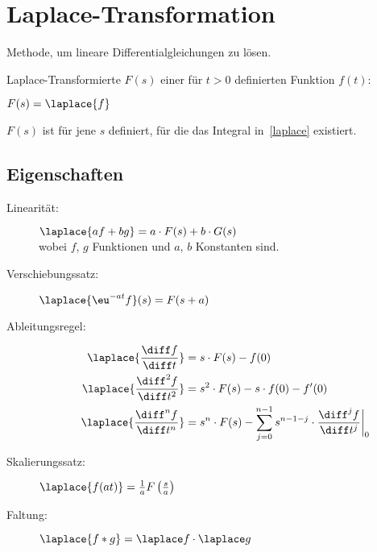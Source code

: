 
\section{Laplace-Transformation} %
	Methode, um lineare Differentialgleichungen zu lösen.

	\begin{definition}
		Laplace-Transformierte $F(s)$ einer für $t > 0$ definierten Funktion $f(t)$:
	\end{definition}

	\begin{notation}
		$
			F(s) = \laplace{f}
		$
	\end{notation}

	\begin{bemerkung}
		$F(s)$ ist für jene $s$ definiert, für die das Integral in~\eqref{laplace} existiert.
	\end{bemerkung}
	
	\subsection{Eigenschaften} %
		\begin{description}
			\item[Linearität:]
			$
				\laplace{a f + b g} = a \cdot F(s) + b \cdot G(s)
			$ \\[1ex]
			wobei $f$, $g$ Funktionen und $a$, $b$ Konstanten sind.

			\item[Verschiebungssatz:]
			$
				\laplace{\eu^{-at}f}(s) = F(s+a)
			$

			\item[Ableitungsregel:]
			\begin{align*}
				\laplace{\frac{\diff f}{\diff t}} &= s \cdot F(s) - f(0) \\
				\laplace{\frac{\diff^2 f}{\diff t^2}} &= s^2 \cdot F(s) - s \cdot f(0) - f'(0) \\
				\laplace{\frac{\diff^n f}{\diff t^n}} &= s^n \cdot F(s) - \sum_{j=0}^{n-1} s^{n-1-j} \cdot  \frac{\diff^j f}{\diff t^j} \bigg|_0
			\end{align*}
			
			\item[Skalierungssatz:] $\laplace{f(at)} = \frac{1}{a} F \left(\frac{s}{a}\right)$
			
			\item[Faltung:] $\laplace{f*g} = \laplace f \cdot \laplace g$
		\end{description}

